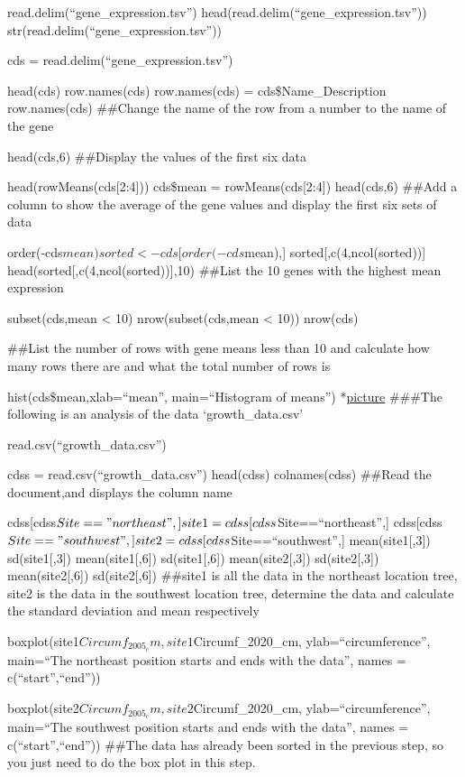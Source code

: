 \documentclass[
]{article}
\begin{document}
read.delim(``gene\_expression.tsv'')
head(read.delim(``gene\_expression.tsv''))
str(read.delim(``gene\_expression.tsv''))

cds = read.delim(``gene\_expression.tsv'')

head(cds) row.names(cds) row.names(cds) = cds\$Name\_Description
row.names(cds) \#\#Change the name of the row from a number to the name
of the gene

head(cds,6) \#\#Display the values of the first six data

head(rowMeans(cds{[}2:4{]})) cds\$mean = rowMeans(cds{[}2:4{]})
head(cds,6) \#\#Add a column to show the average of the gene values and
display the first six sets of data

order(-cds\(mean) sorted <- cds[order(-cds\)mean),{]}
sorted{[},c(4,ncol(sorted)){]} head(sorted{[},c(4,ncol(sorted)){]},10)
\#\#List the 10 genes with the highest mean expression

subset(cds,mean \textless{} 10) nrow(subset(cds,mean \textless{} 10))
nrow(cds)

\#\#List the number of rows with gene means less than 10 and calculate
how many rows there are and what the total number of rows is

hist(cds\$mean,xlab=``mean'', main=``Histogram of means'')
*\href{http://ziemann-lab.net:8787/files/project/ast\%203/Histogram.png}{picture}
\#\#\#The following is an analysis of the data `growth\_data.csv'

read.csv(``growth\_data.csv'')

cdss = read.csv(``growth\_data.csv'') head(cdss) colnames(cdss) \#\#Read
the document,and displays the column name

cdss{[}cdss\(Site=="northeast",] site1 = cdss[cdss\)Site==``northeast'',{]}
cdss{[}cdss\(Site=="southwest",] site2 = cdss[cdss\)Site==``southwest'',{]}
mean(site1{[},3{]}) sd(site1{[},3{]}) mean(site1{[},6{]})
sd(site1{[},6{]}) mean(site2{[},3{]}) sd(site2{[},3{]})
mean(site2{[},6{]}) sd(site2{[},6{]}) \#\#site1 is all the data in the
northeast location tree, site2 is the data in the southwest location
tree, determine the data and calculate the standard deviation and mean
respectively

boxplot(site1\(Circumf_2005_cm, site1\)Circumf\_2020\_cm,
ylab=``circumference'', main=``The northeast position starts and ends
with the data'', names = c(``start'',``end''))

boxplot(site2\(Circumf_2005_cm, site2\)Circumf\_2020\_cm,
ylab=``circumference'', main=``The southwest position starts and ends
with the data'', names = c(``start'',``end'')) \#\#The data has already
been sorted in the previous step, so you just need to do the box plot in
this step.
\end{document}
